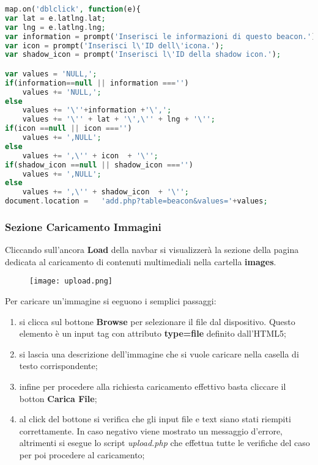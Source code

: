 \begin{lstlisting}[language=PHP]
map.on('dblclick', function(e){
var lat = e.latlng.lat; 
var lng = e.latlng.lng;
var information = prompt('Inserisci le informazioni di questo beacon.');
var icon = prompt('Inserisci l\'ID dell\'icona.');
var shadow_icon = prompt('Inserisci l\'ID della shadow icon.');

var values = 'NULL,';
if(information==null || information ==='')
	values += 'NULL,';
else
	values += '\''+information +'\',';
	values += '\'' + lat + '\',\'' + lng + '\'';
if(icon ==null || icon ==='')
	values += ',NULL';
else
	values += ',\'' + icon  + '\'';        
if(shadow_icon ==null || shadow_icon ==='')
	values += ',NULL';
else
	values += ',\'' + shadow_icon  + '\'';      
document.location =   'add.php?table=beacon&values='+values;
\end{lstlisting}
\newpage
\subsubsection{Sezione Caricamento Immagini}
Cliccando sull'ancora \textbf{Load} della navbar si visualizzerà la sezione della pagina dedicata al caricamento di contenuti multimediali nella cartella \textbf{images}. 

\begin{figure}[h]
	\centering
	\label{fig:upload}
	\texttt{[image: upload.png]}
\end{figure} 

Per caricare un'immagine si eeguono i semplici passaggi:
\begin{enumerate}
\item si clicca sul bottone \textbf{Browse} per selezionare il file dal dispositivo. Questo elemento è un input tag con attributo \textbf{type=file} definito dall'HTML5;
\item si lascia una descrizione dell'immagine che si vuole caricare nella casella di testo corrispondente;
\item infine per procedere alla richiesta caricamento effettivo basta cliccare il botton \textbf{Carica File};
\item al click del bottone si verifica che gli input file e text siano stati riempiti correttamente. In caso negativo viene mostrato un messaggio d'errore, altrimenti si esegue lo script \textit{upload.php} che effettua tutte le verifiche del caso per poi procedere al caricamento;
\end{enumerate}

